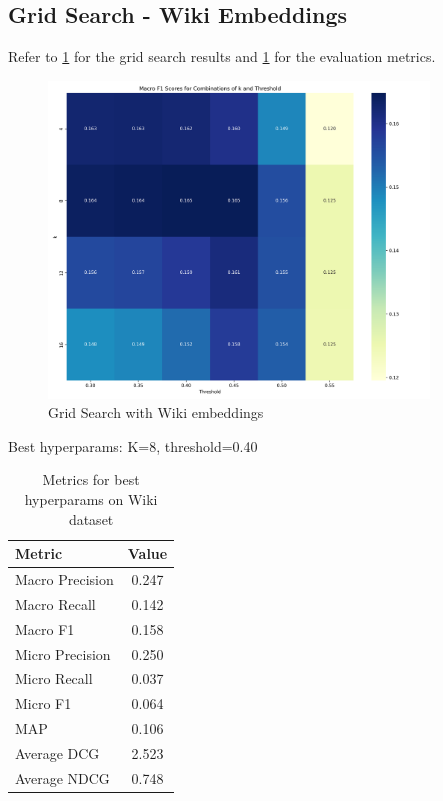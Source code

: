 \documentclass[a4paper,11pt]{article}
\begin{document}
\subsection{Grid Search - Wiki Embeddings}
Refer to \ref{fig:wiki_embeddings_heatmap} for the grid search results and \ref{tab:wiki_embeddings} for the evaluation metrics.
\begin{figure}
    \centering
    \includegraphics[width=0.9\textwidth]{wiki_embeddings_heatmap.png_1747347453.png}
    \caption{Grid Search with Wiki embeddings}
    \label{fig:wiki_embeddings_heatmap}
\end{figure}

Best hyperparams: K=8, threshold=0.40
\begin{table}
    \centering
    \begin{tabular}{|l|c|}
        \hline
        Metric          & Value \\
        \hline
        Macro Precision & 0.247 \\
        Macro Recall    & 0.142 \\
        Macro F1        & 0.158 \\
        Micro Precision & 0.250 \\
        Micro Recall    & 0.037 \\
        Micro F1        & 0.064 \\
        MAP             & 0.106 \\
        Average DCG     & 2.523 \\
        Average NDCG    & 0.748 \\
        \hline
    \end{tabular}
    \caption{Metrics for best hyperparams on Wiki dataset}
    \label{tab:wiki_embeddings}
\end{table}
\end{document}
